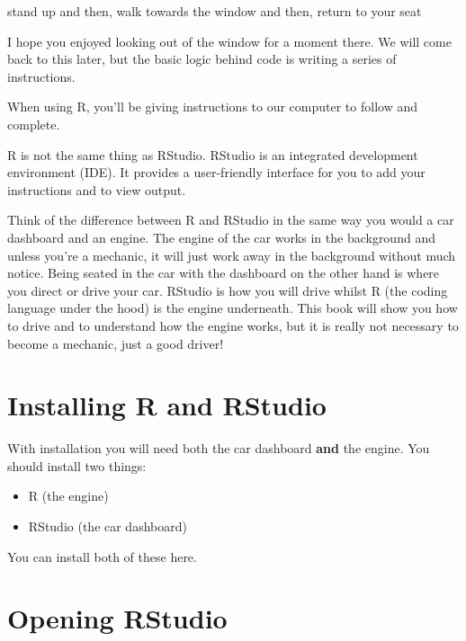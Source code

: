 \documentclass[
]{book}
\newenvironment{Shaded}{\begin{snugshade}}{\end{snugshade}}
\newcommand{\AttributeTok}[1]{\textcolor[rgb]{0.13,0.29,0.53}{#1}}
\newcommand{\NormalTok}[1]{#1}
\newcommand{\StringTok}[1]{\textcolor[rgb]{0.31,0.60,0.02}{#1}}
\providecommand{\tightlist}{%
  \setlength{\itemsep}{0pt}\setlength{\parskip}{0pt}}
\let\oldsection\section
\renewcommand{\section}{\needspace{5\baselineskip}\oldsection}
\begin{document}
\begin{Shaded}
\begin{Highlighting}[]
\StringTok{\textasciigrave{}}\AttributeTok{stand up}\StringTok{\textasciigrave{}}\NormalTok{ and then,}
\StringTok{\textasciigrave{}}\AttributeTok{walk towards the window}\StringTok{\textasciigrave{}}\NormalTok{ and then,}
\StringTok{\textasciigrave{}}\AttributeTok{return to your seat}\StringTok{\textasciigrave{}}
\end{Highlighting}
\end{Shaded}

I hope you enjoyed looking out of the window for a moment there. We will come back to this later, but the basic logic behind code is writing a series of instructions.

When using R, you'll be giving instructions to our computer to follow and complete.

R is not the same thing as RStudio. RStudio is an integrated development environment (IDE). It provides a user-friendly interface for you to add your instructions and to view output.

Think of the difference between R and RStudio in the same way you would a car dashboard and an engine. The engine of the car works in the background and unless you're a mechanic, it will just work away in the background without much notice. Being seated in the car with the dashboard on the other hand is where you direct or drive your car. RStudio is how you will drive whilst R (the coding language under the hood) is the engine underneath. This book will show you how to drive and to understand how the engine works, but it is really not necessary to become a mechanic, just a good driver!

\section{Installing R and RStudio}\label{installing-r-and-rstudio}

With installation you will need both the car dashboard \textbf{and} the engine. You should install two things:

\begin{itemize}
\tightlist
\item
  R (the engine)
\item
  RStudio (the car dashboard)
\end{itemize}

You can install both of these here.

\section{Opening RStudio}\label{opening-rstudio}
\end{document}
